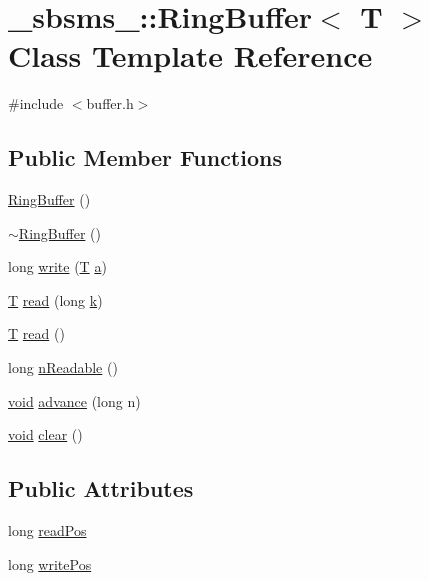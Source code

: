 \hypertarget{class__sbsms___1_1_ring_buffer}{}\section{\+\_\+sbsms\+\_\+\+:\+:Ring\+Buffer$<$ T $>$ Class Template Reference}
\label{class__sbsms___1_1_ring_buffer}


{\ttfamily \#include $<$buffer.\+h$>$}

\subsection*{Public Member Functions}
\begin{DoxyCompactItemize}
\item 
\hyperlink{class__sbsms___1_1_ring_buffer_a93b9973de32a836bdf70befaf9d78eed}{Ring\+Buffer} ()
\item 
\hyperlink{class__sbsms___1_1_ring_buffer_a2715b2e99ea24521ef7a586c2f33e1c9}{$\sim$\+Ring\+Buffer} ()
\item 
long \hyperlink{class__sbsms___1_1_ring_buffer_a3654dca2719b6556fb4275cdbb53323a}{write} (\hyperlink{xmltchar_8h_a16a0f7e7053a679c9bf4289b441a2be7}{T} \hyperlink{rfft2d_test_m_l_8m_a4124bc0a9335c27f086f24ba207a4912}{a})
\item 
\hyperlink{xmltchar_8h_a16a0f7e7053a679c9bf4289b441a2be7}{T} \hyperlink{class__sbsms___1_1_ring_buffer_a9f254a67af6021b9e0824b08f13bda59}{read} (long \hyperlink{rfft2d_test_m_l_8m_adc468c70fb574ebd07287b38d0d0676d}{k})
\item 
\hyperlink{xmltchar_8h_a16a0f7e7053a679c9bf4289b441a2be7}{T} \hyperlink{class__sbsms___1_1_ring_buffer_a82e48ff6d2c1a40715765b99a1a00ca5}{read} ()
\item 
long \hyperlink{class__sbsms___1_1_ring_buffer_a0e1240a90b221d381ce3e3025b11661f}{n\+Readable} ()
\item 
\hyperlink{sound_8c_ae35f5844602719cf66324f4de2a658b3}{void} \hyperlink{class__sbsms___1_1_ring_buffer_ae2bf5b40797a0e72c9f62b35921cb3d9}{advance} (long n)
\item 
\hyperlink{sound_8c_ae35f5844602719cf66324f4de2a658b3}{void} \hyperlink{class__sbsms___1_1_ring_buffer_a735642a4e7374d672c10fff09c88d1ef}{clear} ()
\end{DoxyCompactItemize}
\subsection*{Public Attributes}
\begin{DoxyCompactItemize}
\item 
long \hyperlink{class__sbsms___1_1_ring_buffer_afc6f095d180483226c95db43160add65}{read\+Pos}
\item 
long \hyperlink{class__sbsms___1_1_ring_buffer_a6ec6fb5c1069249c4bcc04610a1bf109}{write\+Pos}
\end{DoxyCompactItemize}
